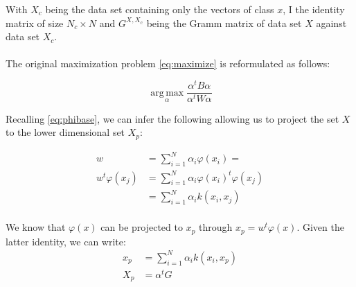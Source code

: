 With $X_c$ being the data set containing only the vectors of class $x$, $\textrm{I}$ the identity matrix of
size $N_c \times N$ and
$G^{X, X_c}$ being the Gramm matrix of data set $X$ against data set $X_c$.

\paragraph{}
The original maximization problem \ref{eq:maximize} is reformulated as follows:

\begin{equation*}
\label{eq:maximize2}
\boxed{\operatorname*{arg\,max}_\alpha \frac{\alpha^t B \alpha}{\alpha^t W \alpha}}
\end{equation*}

Recalling \ref{eq:phibase}, we can infer the following allowing us to project the set $X$ to the
lower dimensional set $X_p$:

\begin{align*}
  w &= \sum_{i=1}^N \alpha_i \varphi(x_i) = \\
  w^t \varphi(x_j) &= \sum_{i = 1}^N \alpha_i \varphi(x_i)^t \varphi(x_j)\\
                   &= \sum_{i = 1}^N \alpha_i k(x_i, x_j) \\
\end{align*}

We know that $\varphi(x)$ can be projected to $x_p$ through $x_p = w^t \varphi(x)$. Given the
latter identity, we can write:
\begin{align*}
x_p &= \sum_{i = 1}^N \alpha_i k(x_i, x_p) \\
X_p &= \alpha^t G \\
\end{align*}
